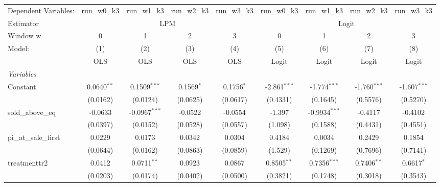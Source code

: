 \begin{tabular}{lcccccccc}
   \tabularnewline \midrule \midrule
   Dependent Variables:   & run\_w0\_k3   & run\_w1\_k3     & run\_w2\_k3   & run\_w3\_k3   & run\_w0\_k3    & run\_w1\_k3     & run\_w2\_k3    & run\_w3\_k3\\    
   Estimator & \multicolumn{4}{c}{LPM} & \multicolumn{4}{c}{Logit} \\ 
   Window w               & 0             & 1               & 2             & 3             & 0              & 1               & 2              & 3 \\   
   Model:                 & (1)           & (2)             & (3)           & (4)           & (5)            & (6)             & (7)            & (8)\\  
                          &  OLS          & OLS             & OLS           & OLS           & Logit          & Logit           & Logit          & Logit\\  
   \midrule
   \emph{Variables}\\
   Constant               & 0.0640$^{**}$ & 0.1509$^{***}$  & 0.1569$^{*}$  & 0.1756$^{*}$  & -2.861$^{***}$ & -1.774$^{***}$  & -1.760$^{***}$ & -1.607$^{***}$\\   
                          & (0.0162)      & (0.0124)        & (0.0625)      & (0.0617)      & (0.4331)       & (0.1645)        & (0.5576)       & (0.5270)\\   
   sold\_above\_eq        & -0.0633       & -0.0967$^{***}$ & -0.0522       & -0.0554       & -1.397         & -0.9934$^{***}$ & -0.4117        & -0.4102\\   
                          & (0.0397)      & (0.0152)        & (0.0528)      & (0.0557)      & (1.098)        & (0.1588)        & (0.4431)       & (0.4551)\\   
   pi\_at\_sale\_first    & 0.0229        & 0.0173          & 0.0342        & 0.0304        & 0.4184         & 0.0034          & 0.2429         & 0.1854\\   
                          & (0.0644)      & (0.0162)        & (0.0863)      & (0.0859)      & (1.529)        & (0.1269)        & (0.7696)       & (0.7141)\\   
   treatmenttr2           & 0.0412        & 0.0711$^{**}$   & 0.0923        & 0.0867        & 0.8505$^{**}$  & 0.7356$^{***}$  & 0.7406$^{**}$  & 0.6617$^{*}$\\   
                          & (0.0203)      & (0.0174)        & (0.0402)      & (0.0500)      & (0.3821)       & (0.1748)        & (0.3018)       & (0.3543)\\   

\end{tabular}
